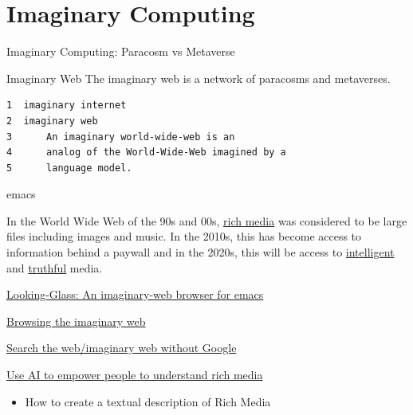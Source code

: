 \documentclass[presentation]{beamer}
\begin{document}
\section{Imaginary Computing}
\label{sec:org5832048}
\begin{frame}[label={sec:org3a4cf92},fragile]{Imaginary Computing: Paracosm vs Metaverse}
 \begin{block}{Imaginary Web}
The imaginary web is a network of paracosms
and metaverses.

\begin{verbatim}
1  imaginary internet
2  imaginary web
3      An imaginary world-wide-web is an
4      analog of the World-Wide-Web imagined by a
5      language model.
\end{verbatim}
\end{block}

\begin{block}{emacs}
\begin{description}
\item[{Rich media}] In the World Wide Web of the 90s and 00s, \uline{rich media}
was considered to be large files including
images and music. In the 2010s, this has become
access to information behind a paywall and in
the 2020s, this will be access to \uline{intelligent}
and \uline{truthful} media.

\item \href{https://semiosis.github.io/looking-glass/}{Looking-Glass: An imaginary-web browser for emacs}
\item \href{https://mullikine.github.io/posts/the-imaginary-web-with-codex/}{Browsing the imaginary web}
\item \href{https://mullikine.github.io/posts/search-the-web-with-codex/}{Search the web/imaginary web without Google}
\item \href{https://mullikine.github.io/posts/alephalpha-for-alttext/}{Use AI to empower people to understand rich media}
\begin{itemize}
\item How to create a textual description of Rich Media
\end{itemize}
\end{description}
\end{block}
\end{frame}
\end{document}

